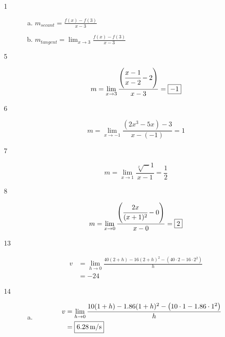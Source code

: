 \documentclass[letterpaper, landscape]{exam}
\begin{document}
    \begin{description}

      \item[1] 
        \begin{enumerate}[(a)]

          \item $m_{secant} = \frac{f(x) - f(3)}{x - 3}$ 

          \item $m_{tangent} = \lim_{x \to 3} \frac{f(x) - f(3)}{x - 3}$ 

        \end{enumerate}




      \item[5]
        \[
          m = \lim_{x \to 3} \frac{ \left( \cfrac{x - 1}{x - 2} - 2 \right) }{x - 3} = \boxed{ -1 }
        \]

      \item[6]
        \[
          m = \lim_{x \to -1} \frac{ \left(  2x^3 - 5x \right) - 3 }{x - (-1)} = \boxed{ 1 }
        \]

      \item[7]
        \[
          m = \lim_{x \to 1} \frac{ \sqrt[x] - 1 }{x - 1} = \boxed{ \frac{1}{2} }
        \]

      \item[8]
        \[
          m = \lim_{x \to 0} \frac{ \left( \cfrac{2x}{(x + 1)^2} - 0 \right) }{x - 0} = \boxed{ 2 }
        \]
      
      \item[13]
        \begin{align*}
          v & = \lim_{h \to 0} \frac{ 40(2 + h) - 16 (2 + h)^2 - \left( 40 \cdot 2 - 16 \cdot 2^2 \right)}{h} \\
            & = \boxed{ -24 }
        \end{align*}

      \item[14]
        \begin{enumerate}[(a)]
          \item 
            \begin{align*}
              v & = \lim_{h \to 0} \frac{ 10(1 + h) - 1.86 (1 + h)^2 - \left( 10 \cdot 1 - 1.86 \cdot 1^2 \right) }{h} \\
                & = \boxed{ \unit[6.28]{m/s} }
            \end{align*}


\end{enumerate}
\end{description}
\end{document}
